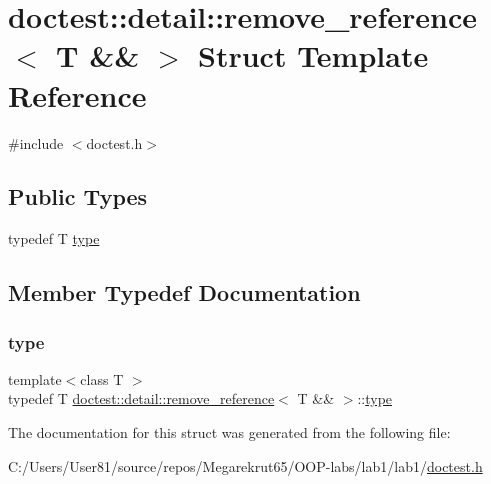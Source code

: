 \hypertarget{structdoctest_1_1detail_1_1remove__reference_3_01_t_01_6_6_01_4}{}\section{doctest\+:\+:detail\+:\+:remove\+\_\+reference$<$ T \&\& $>$ Struct Template Reference}
\label{structdoctest_1_1detail_1_1remove__reference_3_01_t_01_6_6_01_4}


{\ttfamily \#include $<$doctest.\+h$>$}

\subsection*{Public Types}
\begin{DoxyCompactItemize}
\item 
typedef T \mbox{\hyperlink{structdoctest_1_1detail_1_1remove__reference_3_01_t_01_6_6_01_4_af5f63a14f4e74e0c3c733c00e2f37213}{type}}
\end{DoxyCompactItemize}


\subsection{Member Typedef Documentation}
\mbox{\label{structdoctest_1_1detail_1_1remove__reference_3_01_t_01_6_6_01_4_af5f63a14f4e74e0c3c733c00e2f37213}} 
\subsubsection{\texorpdfstring{type}{type}}
{\footnotesize\ttfamily template$<$class T $>$ \\
typedef T \mbox{\hyperlink{structdoctest_1_1detail_1_1remove__reference}{doctest\+::detail\+::remove\+\_\+reference}}$<$ T \&\& $>$\+::\mbox{\hyperlink{structdoctest_1_1detail_1_1remove__reference_3_01_t_01_6_6_01_4_af5f63a14f4e74e0c3c733c00e2f37213}{type}}}



The documentation for this struct was generated from the following file\+:\begin{DoxyCompactItemize}
\item 
C\+:/\+Users/\+User81/source/repos/\+Megarekrut65/\+O\+O\+P-\/labs/lab1/lab1/\mbox{\hyperlink{doctest_8h}{doctest.\+h}}\end{DoxyCompactItemize}
